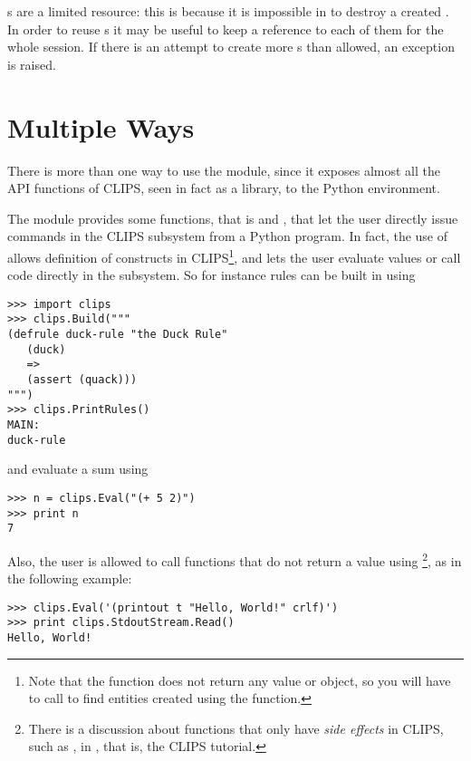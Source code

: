 s are a limited resource: this is because it is
impossible in \pyclips{} to destroy a created .
In order to reuse s it may be useful to keep a
reference to each of them for the whole \pyclips{} session. If there
is an attempt to create more s than allowed, an
exception is raised.



\section{Multiple Ways\label{pyclips-unotes-multiw}}

There is more than one way to use the \pyclips{} module, since it exposes
almost all the API functions of CLIPS, seen in fact as a library, to the
Python environment.

The module \pyclips{} provides some functions, that is 
and , that let the user directly issue commands in the
CLIPS subsystem from a Python program. In fact, the use of 
allows definition of constructs in CLIPS\footnote{Note that the
 function does not return any value or object, so you
will have to call  to find entities created
using the  function.}, and  lets the user
evaluate values or call code directly in the subsystem. So for instance
rules can be built in \pyclips{} using

\begin{verbatim}
>>> import clips
>>> clips.Build("""
(defrule duck-rule "the Duck Rule"
   (duck)
   =>
   (assert (quack)))
""")
>>> clips.PrintRules()
MAIN:
duck-rule
\end{verbatim}

and evaluate a sum using

\begin{verbatim}
>>> n = clips.Eval("(+ 5 2)")
>>> print n
7
\end{verbatim}

Also, the user is allowed to call functions that do not return a value
using \footnote{There is a discussion about functions
that only have \emph{side effects} in CLIPS, such as , in
\clipstut{}, that is, the CLIPS tutorial.}, as in the following example:

\begin{verbatim}
>>> clips.Eval('(printout t "Hello, World!" crlf)')
>>> print clips.StdoutStream.Read()
Hello, World!
\end{verbatim}

